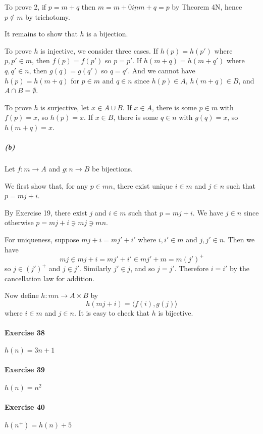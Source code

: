 \documentclass{report}
\begin{document}
    To prove 2, if $p = m + q$ then $m = m + 0 \underline{in} m + q = p$ by Theorem 4N, hence $p \notin m$
    by trichotomy.

    It remains to show that $h$ is a bijection.

    To prove $h$ is injective, we consider three cases. If $h(p) = h(p')$ where $p, p' \in m$,
    then $f(p) = f(p')$ so $p = p'$. If $h(m+q) = h(m+q')$ where $q,q' \in n$, then $g(q) = g(q')$
    so $q = q'$. And we cannot have $h(p) = h(m+q)$ for $p \in m$ and $q \in n$ since $h(p) \in A$,
    $h(m+q) \in B$, and $A \cap B = \emptyset$.

    To prove $h$ is surjective, let $x \in A \cup B$. If $x \in A$, there is some $p \in m$ with $f(p) = x$,
    so $h(p) = x$. If $x \in B$, there is some $q \in n$ with $g(q) = x$, so $h(m+q) = x$.

    \subparagraph{(b)}
    Let $f : m \rightarrow A$ and $g : n \rightarrow B$ be bijections.

    We first show that, for any $p \in mn$, there exist unique $i \in m$ and $j \in n$ such that
    $p = mj+i$. 
    
    By Exercise 19, there exist $j$ and $i \in m$ such that $p = mj+i$. We have $j \in n$
    since otherwise $p = mj+i \underline{\ni} mj \underline{\ni} mn$.

    For uniqueness, suppose $mj + i = mj' + i'$ where $i, i' \in m$ and $j, j' \in n$.
    Then we have
    \[ mj \underline{\in} mj + i = mj' + i' \in mj' + m = m(j')^+ \]
    so $j \in (j')^+$ and $j \underline{\in} j'$. Similarly $j' \underline{\in} j$, and so $j = j'$. Therefore
    $i = i'$ by the cancellation law for addition.

    Now define $h : mn \rightarrow A \times B$ by
    \[ h(mj+i) = \langle f(i), g(j) \rangle \]
    where $i \in m$ and $j \in n$. It is easy to check that $h$ is bijective.

    \paragraph{Exercise 38}
    $h(n) = 3n+1$

    \paragraph{Exercise 39}
    $h(n) = n^2$

    \paragraph{Exercise 40}
    $h(n^+) = h(n) + 5$
\end{document}
